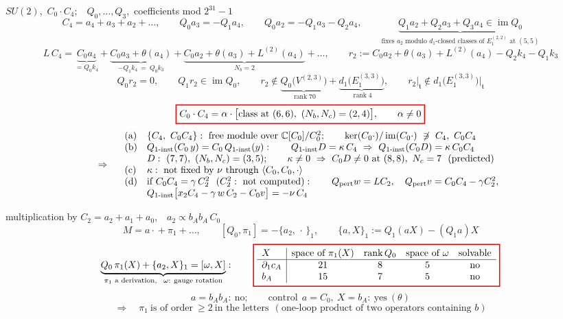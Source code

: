 \documentclass[10pt]{article}
\newcommand{\tagbox}[1]{\fbox{\footnotesize #1}}
\newcommand{\sred}[1]{{\setlength{\fboxrule}{1.1pt}\fcolorbox{red}{white}{$\displaystyle #1$}}}
\begin{document}
\tagbox{computed}\quad $SU(2)$,\ $C_0\cdot C_4$;\ \ $Q_0,\dots,Q_3$,\ coefficients mod $2^{31}-1$
\[
C_4=a_4+a_3+a_2+\dots,\qquad Q_0a_3=-Q_1a_4,\qquad Q_0a_2=-Q_1a_3-Q_2a_4,\qquad
\underbrace{Q_1a_2+Q_2a_3+Q_3a_4\in\operatorname{im}Q_0}_{\text{fixes }a_2\text{ modulo }d_1\text{-closed classes of }E_1^{(2,2)}\text{ at }(5,5)}
\]
\[
L\,C_4=\underbrace{C_0a_4}_{=Q_0k_4}+\underbrace{C_0a_3+\theta(a_4)}_{-Q_1k_4\ =\ Q_0k_3}+\underbrace{C_0a_2+\theta(a_3)+L^{(2)}(a_4)}_{N_b=2}+\dots,
\qquad
r_2:=C_0a_2+\theta(a_3)+L^{(2)}(a_4)-Q_2k_4-Q_1k_3
\]
\[
Q_0r_2=0,\qquad Q_1r_2\in\operatorname{im}Q_0,\qquad
r_2\notin\underbrace{Q_0\big(V^{(2,3)}\big)}_{\operatorname{rank}70}+\underbrace{d_1\big(E_1^{(3,3)}\big)}_{\operatorname{rank}4},\qquad
r_2\big|_{\mathfrak t}\notin d_1\big(E_1^{(3,3)}\big)\big|_{\mathfrak t}
\]
\[
\sred{C_0\cdot C_4=\alpha\cdot\big[\text{class at }(6,6),\ (N_b,N_c)=(2,4)\big],\qquad \alpha\neq0}
\]
\[
\Rightarrow\quad
\begin{array}{ll}
\text{(a)} & \{C_4,\ C_0C_4\}:\ \text{free module over }\mathbb C[C_0]/C_0^2;\qquad \ker(C_0\cdot)/\operatorname{im}(C_0\cdot)\ \not\ni\ C_4,\ C_0C_4\\
\text{(b)} & Q_{1\text{-inst}}(C_0\,y)=C_0\,Q_{1\text{-inst}}(y):\qquad Q_{1\text{-inst}}D=\kappa\,C_4\ \Rightarrow\ Q_{1\text{-inst}}(C_0D)=\kappa\,C_0C_4\\
 & D:\ (7,7),\ (N_b,N_c)=(3,5);\qquad \kappa\neq0\ \Rightarrow\ C_0D\neq0\ \text{at }(8,8),\ N_c=7\ \ (\text{predicted})\\
\text{(c)} & \kappa:\ \text{not fixed by }\nu\text{ through }\langle C_0,C_0,\cdot\rangle\\
\text{(d)} & \text{if }C_0C_4=\gamma\,C_2^2\ \ (C_2^2:\ \text{not computed}):\qquad Q_{\rm pert}w=LC_2,\quad Q_{\rm pert}v=C_0C_4-\gamma C_2^2,\\
 & Q_{1\text{-inst}}\big[x_2C_4-\gamma\,w\,C_2-C_0v\big]=-\nu\,C_4
\end{array}
\]

\tagbox{$C_2^2$: not computed}\quad multiplication by $C_2=a_2+a_1+a_0$,\ \ $a_2\propto b_Ab_A\,C_0$
\[
M=a\cdot{}+\pi_1+\dots,\qquad [Q_0,\pi_1]=-\{a_2,\,\cdot\,\}_1,\qquad \{a,X\}_1:=Q_1(aX)-(Q_1a)X
\]
\[
\underbrace{Q_0\,\pi_1(X)+\{a_2,X\}_1=[\omega,X]}_{\pi_1\text{ a derivation},\ \ \omega:\ \text{gauge rotation}}:\qquad
\sred{\begin{array}{l|cccc}
X & \text{space of }\pi_1(X) & \operatorname{rank}Q_0 & \text{space of }\omega & \text{solvable}\\\hline
\partial_1c_A & 21 & 8 & 5 & \text{no}\\
b_A & 15 & 7 & 5 & \text{no}
\end{array}}
\]
\[
a=b_Ab_A:\ \text{no};\qquad \text{control}\ \ a=C_0,\ X=b_A:\ \text{yes}\ (\theta)
\]
\[
\Rightarrow\quad \pi_1\ \text{is of order}\ \ge2\ \text{in the letters}\ \ (\text{one-loop product of two operators containing }b)
\]
\end{document}
